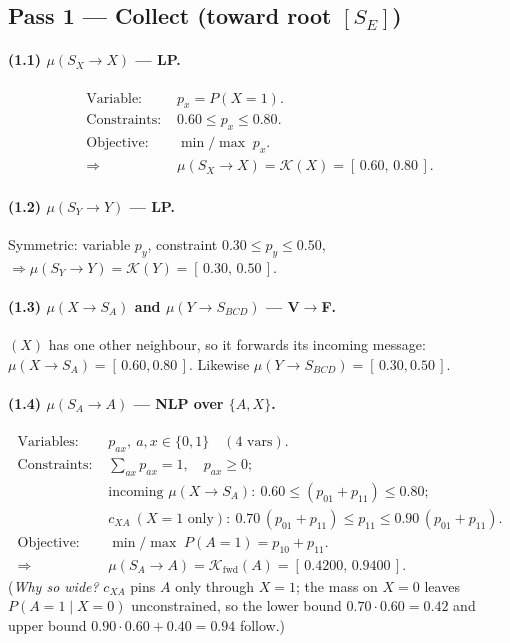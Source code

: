 \documentclass[11pt]{article}
\newcommand{\cK}{\mathcal{K}}
\newcommand{\fwd}{\mathrm{fwd}}
\begin{document}
\subsection{Pass 1 --- Collect (toward root $[S_E]$)}

\paragraph{(1.1) $\mu(S_X\!\to\!X)$ --- LP.}
\begin{align*}
  \text{Variable: } & p_x = P(X{=}1).\\
  \text{Constraints: } & 0.60 \le p_x \le 0.80. \\
  \text{Objective: } & \min/\max\; p_x .\\
  \Rightarrow\;& \mu(S_X\!\to\!X)=\cK(X)=[\,0.60,\,0.80\,].
\end{align*}

\paragraph{(1.2) $\mu(S_Y\!\to\!Y)$ --- LP.}
Symmetric: variable $p_y$, constraint $0.30\le p_y\le 0.50$,
$\Rightarrow \mu(S_Y\!\to\!Y)=\cK(Y)=[\,0.30,\,0.50\,].$

\paragraph{(1.3) $\mu(X\!\to\!S_A)$ and $\mu(Y\!\to\!S_{BCD})$ --- V$\to$F.}
$(X)$ has one other neighbour, so it forwards its incoming message:
$\mu(X\!\to\!S_A)=[\,0.60,0.80\,]$. Likewise
$\mu(Y\!\to\!S_{BCD})=[\,0.30,0.50\,]$.

\paragraph{(1.4) $\mu(S_A\!\to\!A)$ --- NLP over $\{A,X\}$.}
\begin{align*}
  \text{Variables: } & p_{ax},\ a,x\in\{0,1\}\quad(4\text{ vars}).\\
  \text{Constraints: } & \textstyle\sum_{ax}p_{ax}=1,\quad p_{ax}\ge0;\\
                       & \text{incoming } \mu(X\!\to\!S_A):\ 0.60\le (p_{01}{+}p_{11})\le 0.80;\\
                       & c_{XA}\ (X{=}1\text{ only}):\
                          0.70\,(p_{01}{+}p_{11})\le p_{11}\le 0.90\,(p_{01}{+}p_{11}).\\
  \text{Objective: } & \min/\max\; P(A{=}1)=p_{10}{+}p_{11}.\\
  \Rightarrow\;& \mu(S_A\!\to\!A)=\cK_\fwd(A)=[\,0.4200,\,0.9400\,].
\end{align*}
(\emph{Why so wide?} $c_{XA}$ pins $A$ only through $X{=}1$; the mass on
$X{=}0$ leaves $P(A{=}1\mid X{=}0)$ unconstrained, so the lower bound
$0.70\!\cdot\!0.60=0.42$ and upper bound $0.90\!\cdot\!0.60+0.40=0.94$ follow.)
\end{document}
